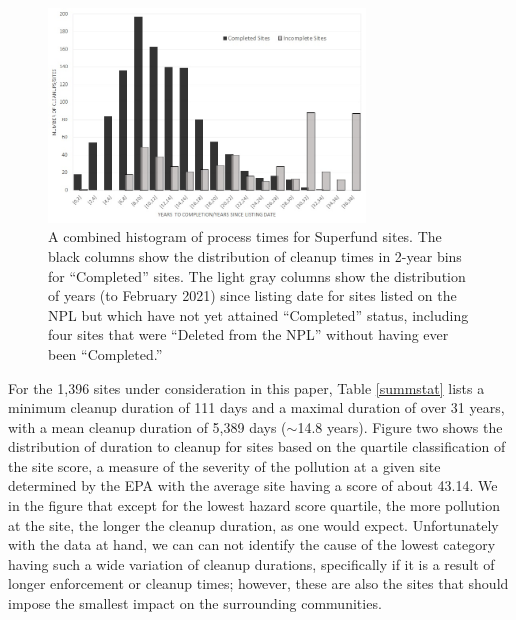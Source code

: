 \documentclass[12pt]{article}
\begin{document}
\begin{figure}[t] \centering
\includegraphics[width=0.75\textwidth]{histogram_combined.jpg}
\caption{A combined histogram of process times for Superfund sites. The black columns show the distribution of cleanup times in 2-year bins for ``Completed'' sites. The light gray columns show the distribution of years (to February 2021) since listing date for sites listed on the NPL but which have not yet attained ``Completed'' status, including four sites that were ``Deleted from the NPL'' without having ever been ``Completed.''
\label{hist1}}
\end{figure}

For the 1,396 sites under consideration in this paper, Table \ref{summstat} lists a minimum cleanup duration of 111 days and a maximal duration of over 31 years, with a mean cleanup duration of 5,389 days ($\sim$14.8 years). Figure two shows the distribution of duration to cleanup for sites based on the quartile classification of the site score, a measure of the severity of the pollution at a given site determined by the EPA with the average site having a score of about 43.14. We in the figure that except for the lowest hazard score quartile, the more pollution at the site, the longer the cleanup duration, as one would expect. Unfortunately with the data at hand, we can can not identify the cause of the lowest category having such a wide variation of cleanup durations, specifically if it is a result of longer enforcement or cleanup times; however, these are also the sites that should impose the smallest impact on the surrounding communities.  

\end{document}
